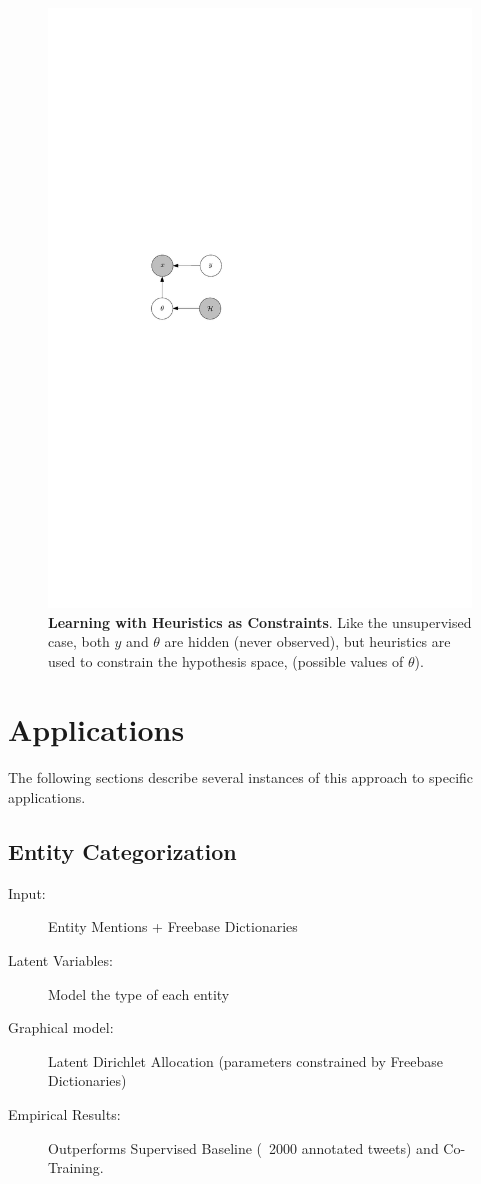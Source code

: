 \documentclass[12pt]{article}
\begin{document}
\begin{figure}
  \centering
  \includegraphics{dlvm_train.pdf}
  \caption{{\bf Learning with Heuristics as Constraints}.  Like the unsupervised case, both $y$ and $\theta$ are hidden (never observed),
  but heuristics are used to constrain the hypothesis space, (possible values of $\theta$).}
  \label{dlvm_train}
\end{figure}


\section{Applications}
The following sections describe several instances of this approach to specific applications.


\subsection{Entity Categorization}
\begin{description}
\item[Input:] Entity Mentions + Freebase Dictionaries
\item[Latent Variables:] Model the type of each entity
\item[Graphical model:] Latent Dirichlet Allocation (parameters constrained by Freebase Dictionaries)
\item[Empirical Results:] Outperforms Supervised Baseline (~2000 annotated tweets) and Co-Training.
\end{description}
\end{document}
